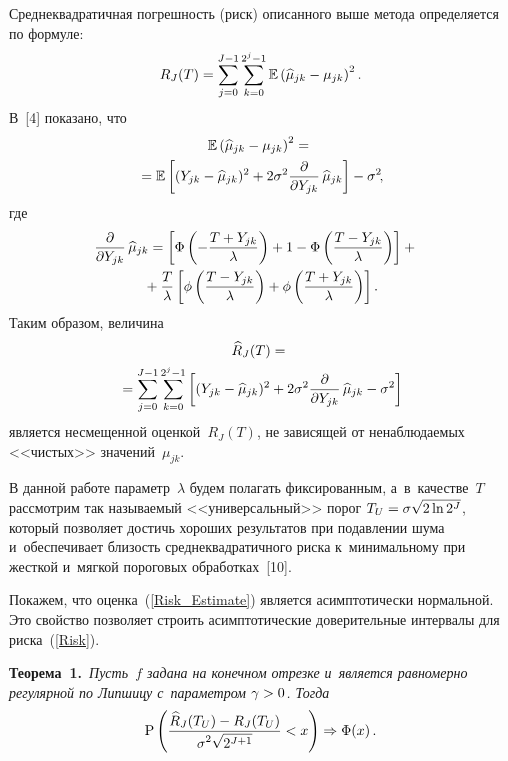 \begin{multicols}{2}
Среднеквадратичная погрешность (риск) описанного выше метода определяется по формуле:
\begin{equation}
\label{Risk}
R_J(T)=\sum\limits_{j=0}^{J-1}\sum\limits_{k=0}^{2^j-1}\mathbb{E}
\left(\widehat{\mu}_{jk}-\mu_{jk}\right)^2.
\end{equation}
В~[4] показано, что
\begin{multline*}
\mathbb{E}\left(\widehat{\mu}_{jk}-\mu_{jk}\right)^2={}\\
{}=
\mathbb{E}\left[(Y_{jk}-\widehat{\mu}_{jk})^2+2\sigma^2
\displaystyle\frac{\displaystyle \partial\mathstrut}{\displaystyle \partial Y_{jk}\mathstrut}\,\widehat{\mu}_{jk}\right]-\sigma^2\!,
\end{multline*}
где
\begin{multline*}
\!\!\!\hspace*{-1.55032pt}\displaystyle\frac{\displaystyle \partial\mathstrut}{\displaystyle \partial Y_{jk}\mathstrut}\,\widehat{\mu}_{jk}=
\left[\Phi\left(-\displaystyle\frac{\displaystyle T+Y_{jk}\mathstrut}{\displaystyle \lambda\mathstrut}\right)+1-
\Phi\left(\displaystyle\frac{\displaystyle T-Y_{jk}\mathstrut}{\displaystyle \lambda\mathstrut}\right)\right]+{}\\
{}+
\displaystyle\frac{\displaystyle T\mathstrut}{\displaystyle \lambda\mathstrut}\left[\phi\left(\displaystyle\frac{\displaystyle T-Y_{jk}\mathstrut}{\displaystyle \lambda\mathstrut}\right)+
\phi\left(\displaystyle\frac{\displaystyle T+Y_{jk}\mathstrut}{\displaystyle \lambda\mathstrut}\right)\right].
\end{multline*}
Таким образом, величина
\begin{multline}
\label{Risk_Estimate}
\widehat{R}_J(T)={}\\
{}=\sum\limits_{j=0}^{J-1}\sum\limits_{k=0}^{2^j-1}
\left[(Y_{jk}-\widehat{\mu}_{jk})^2+2\sigma^2\displaystyle\frac{\displaystyle \partial\mathstrut}{\displaystyle \partial Y_{jk}\mathstrut}\,
\widehat{\mu}_{jk}-\sigma^2\right]
\end{multline}
является несмещенной оценкой~$R_J(T)$, не зависящей от ненаблюдаемых 
<<чистых>> значений~$\mu_{jk}$.

В данной работе параметр~$\lambda$ будем полагать фиксированным, 
а~в~качестве~$T$ рассмотрим так называемый <<универсальный>> порог 
$T_U\hm=\sigma\sqrt{2\ln 2^J}$, который позволяет достичь хороших результатов 
при подавлении шума и~обеспечивает близость среднеквадратичного риска 
к~минимальному при жесткой и~мягкой пороговых обработках~[10].

Покажем, что оценка~(\ref{Risk_Estimate}) является асимптотически нормальной. 
Это свойство позволяет строить асимптотические доверительные интервалы для 
риска~(\ref{Risk}).

\smallskip

\noindent
\textbf{Теорема~1.}\
\textit{Пусть~$f$ задана на конечном отрезке и~является равномерно регулярной по 
Липшицу с~параметром $\gamma\hm>0$. Тогда}
\begin{equation}
\label{Normality}
\mbox{P}\left(\displaystyle\frac{\displaystyle \widehat{R}_J(T_U)-R_J(T_U)\mathstrut}{\displaystyle \sigma^2\sqrt{2^{J+1}}\mathstrut}<x\right)
\Rightarrow\Phi(x)\,.
\end{equation}


\end{multicols}

